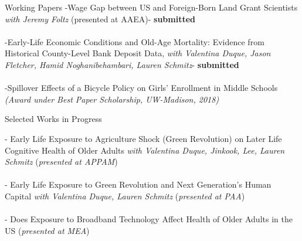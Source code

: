 \documentclass{resume} %
\begin{document}
\begin{rSection}{Working Papers}
-Wage Gap between US and Foreign-Born Land Grant Scientists  \textit{with Jeremy Foltz} (presented at AAEA)- \textbf{submitted}\\ \\
-Early-Life Economic Conditions and Old-Age Mortality: Evidence from Historical County-Level Bank Deposit Data, \textit{with Valentina Duque, Jason Fletcher, Hamid Noghanibehambari, Lauren Schmitz}- \textbf{submitted} \\ \\
-Spillover Effects of a Bicycle Policy on Girls' Enrollment in Middle Schools \textit{(Award under Best Paper Scholarship, UW-Madison, 2018) }




\end{rSection}


\begin{rSection}{Selected Works in Progress}

- Early Life Exposure to Agriculture Shock (Green Revolution) on Later Life Cognitive Health of Older Adults \textit{with Valentina Duque, Jinkook, Lee, Lauren Schmitz} (\textit{presented at APPAM}) \\ \\
- Early Life Exposure to Green Revolution and Next Generation's Human Capital \textit{with Valentina Duque, Lauren Schmitz} (\textit{presented at PAA}) \\ \\
- Does Exposure to Broadband Technology Affect Health of Older Adults in the US (\textit{presented at MEA})
\end{rSection}


\end{document}
